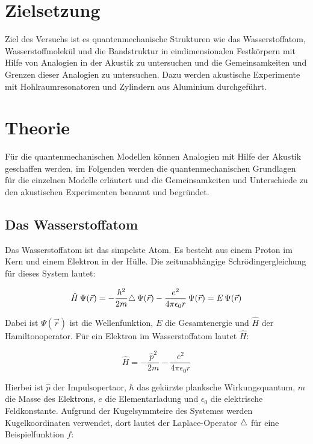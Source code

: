 \section{Zielsetzung}
\label{sec:ziel}

Ziel des Versuchs ist es quantenmechanische Strukturen wie das Wasserstoffatom, Wasserstoffmolekül und die Bandstruktur in eindimensionalen Festkörpern mit Hilfe von Analogien in der Akustik zu untersuchen und die Gemeinsamkeiten und Grenzen dieser Analogien zu untersuchen. Dazu werden akustische Experimente mit Hohlraumresonatoren und Zylindern aus Aluminium durchgeführt.

\section{Theorie}
\label{sec:theorie}

Für die quantenmechanischen Modellen können Analogien mit Hilfe der Akustik geschaffen werden, im Folgenden werden die quantenmechanischen Grundlagen für die einzelnen Modelle erläutert und die Gemeinsamkeiten und Unterschiede zu den akustischen Experimenten benannt und begründet. 

\subsection{Das Wasserstoffatom}
\label{sec:H}

Das Wasserstoffatom ist das simpelste Atom. Es besteht aus einem Proton im Kern und einem Elektron in der Hülle. Die zeitunabhängige Schrödingergleichung für dieses System lautet:

\begin{equation}
    \hat{H} \, \Psi \! \left( \vec{r} \right) = - \frac{\hbar^2}{2 m} \! \mathop{}\!\mathbin\bigtriangleup \, \Psi \! \left( \vec{r} \right)- \frac{e^2}{4 \pi \epsilon_0 r} \, \Psi \! \left( \vec{r} \right) = E \, \Psi \! \left( \vec{r} \right)
    \label{eqn:schroedinger}
\end{equation}

Dabei ist $\Psi \! \left( \vec{r} \right)$ ist die Wellenfunktion, $E$ die Gesamtenergie und $\hat{H}$ der Hamiltonoperator. Für ein Elektron im Wasserstoffatom lautet $\hat{H}$:

\begin{equation}
    \hat{H} = - \frac{\hat{p}^2}{2 m} - \frac{e^2}{4 \pi \epsilon_0 r}
    \label{eqn:H_H}
\end{equation}

Hierbei ist $\hat{p}$ der Impulsopertaor, $\hbar$ das gekürzte planksche Wirkungsquantum, $m$ die Masse des Elektrons, $e$ die Elementarladung und $\epsilon_0$ die elektrische Feldkonstante. Aufgrund der Kugelsymmteire des Systemes werden Kugelkoordinaten verwendet, dort lautet der Laplace-Operator $\mathop{}\!\mathbin\bigtriangleup$ für eine Beispielfunktion $f$:

